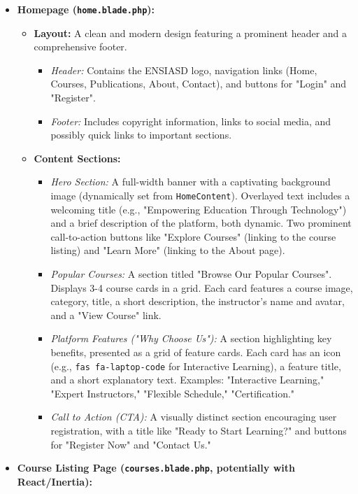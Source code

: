 \documentclass[12pt,a4paper]{article}
\begin{document}
\begin{itemize}
    \item \textbf{Homepage (\texttt{home.blade.php}):}
    \begin{itemize}
        \item \textbf{Layout:} A clean and modern design featuring a prominent header and a comprehensive footer.
        \begin{itemize}
            \item \textit{Header:} Contains the ENSIASD logo, navigation links (Home, Courses, Publications, About, Contact), and buttons for "Login" and "Register".
            \item \textit{Footer:} Includes copyright information, links to social media, and possibly quick links to important sections.
        \end{itemize}
        \item \textbf{Content Sections:}
        \begin{itemize}
            \item \textit{Hero Section:} A full-width banner with a captivating background image (dynamically set from \texttt{HomeContent}). Overlayed text includes a welcoming title (e.g., "Empowering Education Through Technology") and a brief description of the platform, both dynamic. Two prominent call-to-action buttons like "Explore Courses" (linking to the course listing) and "Learn More" (linking to the About page).
            \item \textit{Popular Courses:} A section titled "Browse Our Popular Courses". Displays 3-4 course cards in a grid. Each card features a course image, category, title, a short description, the instructor's name and avatar, and a "View Course" link.
            \item \textit{Platform Features ("Why Choose Us"):} A section highlighting key benefits, presented as a grid of feature cards. Each card has an icon (e.g., \texttt{fas fa-laptop-code} for Interactive Learning), a feature title, and a short explanatory text. Examples: "Interactive Learning," "Expert Instructors," "Flexible Schedule," "Certification."
            \item \textit{Call to Action (CTA):} A visually distinct section encouraging user registration, with a title like "Ready to Start Learning?" and buttons for "Register Now" and "Contact Us."
        \end{itemize}
    \end{itemize}
    \item \textbf{Course Listing Page (\texttt{courses.blade.php}, potentially with React/Inertia):}

\end{itemize}
\end{document}
